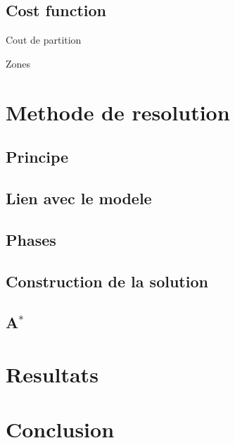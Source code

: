 \documentclass[tikz]{beamer}
\begin{document}
\subsection{Cost function}
\begin{frame}
  {Cout de partition}
  \begin{block}
    {Zones}
  \end{block}
\end{frame}

\section{Methode de resolution}

\subsection{Principe}
\subsection{Lien avec le modele}
\subsection{Phases}
\subsection{Construction de la solution}
\subsection{A\(^*\)}

\section{Resultats}

\section*{Conclusion}
\end{document}
